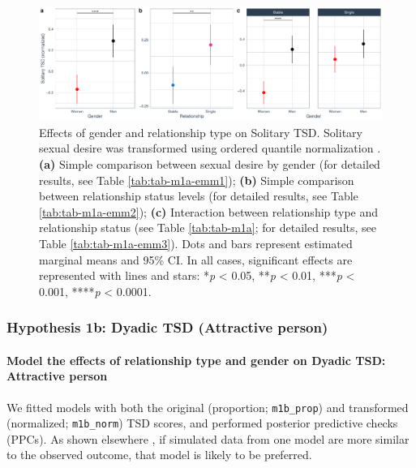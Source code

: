\documentclass[
  bookmarksnumbered]{article}
\begin{document}
\begin{figure}
\centering
\includegraphics{Sexual_Desire_Arousal_files/figure-latex/fig-h1a-1.pdf}
\caption{\label{fig:fig-h1a}Effects of gender and relationship type on Solitary TSD. Solitary sexual desire was transformed using ordered quantile normalization \autocite{petersonOrderedQuantileNormalization2020a}. \textbf{(a)} Simple comparison between sexual desire by gender (for detailed results, see Table \ref{tab:tab-m1a-emm1}); \textbf{(b)} Simple comparison between relationship status levels (for detailed results, see Table \ref{tab:tab-m1a-emm2}); \textbf{(c)} Interaction between relationship type and relationship status (see Table \ref{tab:tab-m1a}; for detailed results, see Table \ref{tab:tab-m1a-emm3}). Dots and bars represent estimated marginal means and 95\% CI. In all cases, significant effects are represented with lines and stars: *\emph{p} \textless{} 0.05, **\emph{p} \textless{} 0.01, ***\emph{p} \textless{} 0.001, ****\emph{p} \textless{} 0.0001.}
\end{figure}

\subsubsection{Hypothesis 1b: Dyadic TSD (Attractive person)}\label{hypothesis1b}

\paragraph{Model the effects of relationship type and gender on Dyadic TSD: Attractive person}\label{model-the-effects-of-relationship-type-and-gender-on-dyadic-tsd-attractive-person}

We fitted models with both the original (proportion; \texttt{m1b\_prop}) and transformed (normalized; \texttt{m1b\_norm}) TSD scores, and performed posterior predictive checks (PPCs). As shown elsewhere \autocite[e.g.,][]{gabryVisualizationBayesianWorkflow2019}, if simulated data from one model are more similar to the observed outcome, that model is likely to be preferred.
\end{document}
